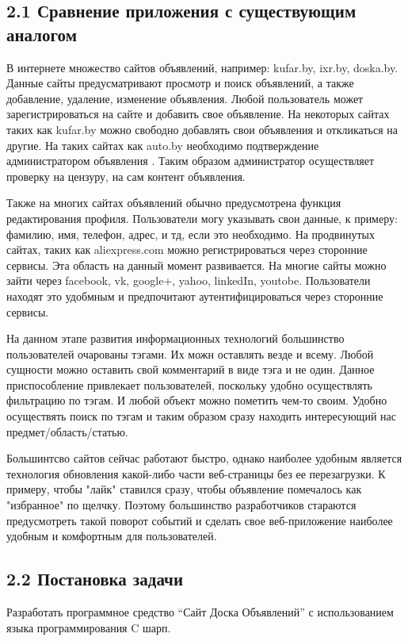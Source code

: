 \documentclass[14pt,a4paper]{extreport}
\begin{document}
	\subsection*{\normalsize\hspace{4ex}2.1 Сравнение приложения с существующим аналогом}
	\hspace{4ex} В интернете множество сайтов объявлений, например: kufar.by, ixr.by, doska.by. Данные сайты предусматривают просмотр и поиск объявлений, а также добавление, удаление, изменение объявления. Любой пользователь может зарегистрироваться на сайте и добавить свое объявление. На некоторых сайтах таких как kufar.by можно свободно добавлять свои объявления и откликаться на другие. На таких сайтах как auto.by необходимо подтверждение администратором объявления . Таким образом администратор осуществляет проверку на цензуру, на сам контент объявления.\par
	Также на многих сайтах объявлений обычно предусмотрена функция редактирования профиля. Пользователи могу указывать свои данные, к примеру: фамилию, имя, телефон, адрес, и тд, если это необходимо. На продвинутых сайтах, таких как aliexpress.com можно регистрироваться через сторонние сервисы. Эта область на данный момент развивается. На многие сайты можно зайти через facebook, vk, google+, yahoo, linkedIn, youtobe. Пользователи находят это удобмным и предпочитают аутентифицироваться через сторонние сервисы.\par
          На данном этапе развития информационных технологий большинство пользователей очарованы тэгами. Их можн оставлять везде и всему. Любой сущности можно оставить свой комментарий в виде тэга и не один. Данное приспособление привлекает пользователей, поскольку удобно осуществлять фильтрацию по тэгам. И любой объект можно пометить чем-то своим. Удобно осуществять поиск по тэгам и таким образом сразу находить интересующий нас предмет/область/статью.\par
         Большинтсво сайтов сейчас работают быстро, однако наиболее удобным является технология обновления какой-либо части веб-страницы без ее перезагрузки. К примеру, чтобы "лайк" ставился сразу, чтобы объявление помечалось как "избранное" по щелчку. Поэтому большинство разработчиков стараются предусмотреть такой поворот событий и сделать свое веб-приложение наиболее удобным и комфортным для пользователей.
	\subsection*{\normalsize\hspace{4ex}2.2 Постановка задачи}
	\hspace{4ex}Разработать программное средство “Сайт Доска Объявлений” с использованием языка программирования C шарп. 
\end{document}
